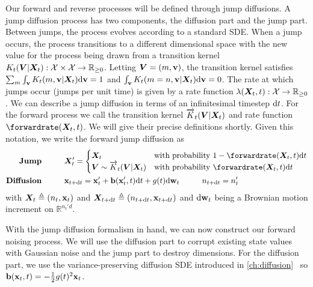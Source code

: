 Our forward and reverse processes will be defined through jump diffusions. A jump diffusion process has two components, the diffusion part and the jump part. Between jumps, the process evolves according to a standard SDE. When a jump occurs, the process transitions to a different dimensional space with the new value for the process being drawn from a transition kernel $K_t({\bm{V}} | {\bm{X}}_t): {\mathcal{X}} \times {\mathcal{X}} \rightarrow  \mathbb{R}_{\geq 0}$. Letting ${\bm{V}} = (m, {\mathbf{v}})$, the transition kernel satisfies $\sum_m \int_{\mathbf{v}} K_t(m, {\mathbf{v}} | {\bm{X}}_t) \mathrm{d} {\mathbf{v}} = 1$ and $\int_{\mathbf{v}} K_t(m=n, {\mathbf{v}} | {\bm{X}}_t) \mathrm{d} {\mathbf{v}} = 0$. The rate at which jumps occur (jumps per unit time) is given by a rate function $\lambda({\bm{X}}_t, t): \mathcal{X} \rightarrow \mathbb{R}_{\geq 0}$. 
We can describe a jump diffusion in terms of an infinitesimal timestep $\mathrm{d} t$. For the forward process we call the transition kernel $\overrightarrow{K}_t({\bm{V}}|{\bm{X}}_t)$ and rate function $\forwardrate(\mX_t, t)$. We will give their precise definitions shortly. Given this notation, we write the forward jump diffusion as
\begin{align}
    \textbf{Jump} \hspace{1cm} & \mX_t' = \begin{cases}
        \mX_t & \text{with probability } 1 - \forwardrate(\mX_t, t) \rmd t \\
        \mV \sim \ftk_t( \mV |\mX_t) & \text{with probability } \forwardrate(\mX_t, t) \rmd t
    \end{cases}  \label{eq:tddm-forward-jump} \\
    \textbf{Diffusion} \hspace{1cm} &\rvx_{t+ \rmd t} = \rvx'_t + \rvb(\rvx'_t, t) \rmd t + g(t) \rmd \brown_t \hspace{1cm} n_{t+\rmd t} = n_t'
     \label{eq:tddm-forward-diffusion}
\end{align}
with ${\bm{X}}_t \triangleq (n_t, {\mathbf{x}}_t)$ and ${\bm{X}}_{t+\mathrm{d} t} \triangleq (n_{t+\mathrm{d} t}, {\mathbf{x}}_{t + \mathrm{d} t})$ and $\mathrm{d} \mathbf{w}_t$ being a Brownian motion increment on $\mathbb{R}^{n_t'd}$.

With the jump diffusion formalism in hand, we can now construct our forward noising process. We will use the diffusion part to corrupt existing state values with Gaussian noise and the jump part to destroy dimensions. For the diffusion part, we use the variance-preserving diffusion SDE introduced in \cref{ch:diffusion}~\cite{ho2020denoising, song2020score} so ${\mathbf{b}}({\mathbf{x}}_t, t) = -\frac{1}{2}g(t)^2 {\mathbf{x}}_t$.

